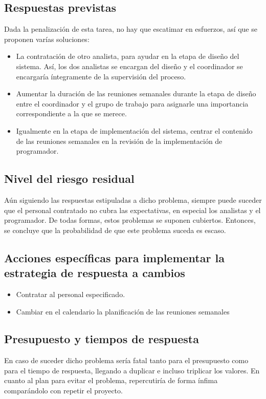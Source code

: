 \documentclass[11pt,a4paper,spanish,twoside]{book}
\begin{document}
\subsection{Respuestas previstas}
Dada la penalización de esta tarea, no hay que escatimar en esfuerzos, así
que se proponen varías soluciones:
\begin{itemize}
\item La contratación de otro analista, para ayudar en la etapa de diseño del
  sistema. Así, los dos analistas se encargan del diseño y el coordinador se
  encargaría íntegramente de la supervisión del proceso.
\item Aumentar la duración de las reuniones semanales durante la etapa de
  diseño entre el coordinador y el grupo de trabajo para asignarle una
  importancia correspondiente a la que se merece.
\item Igualmente en la etapa de implementación del sistema, centrar el
  contenido de las reuniones semanales en la revisión de la implementación de
  programador.
\end{itemize}

\subsection{Nivel del riesgo residual}
Aún siguiendo las respuestas estipuladas a dicho problema, siempre puede
suceder que el personal contratado no cubra las expectativas, en especial los
analistas y el programador. De todas formas, estos problemas se suponen
cubiertos. Entonces, se concluye que la probabilidad de que este problema
suceda es escaso.

\subsection{Acciones específicas para implementar la estrategia de respuesta
  a cambios}
\begin{itemize}
\item Contratar al personal especificado.
\item Cambiar en el calendario la planificación de las reuniones semanales
\end{itemize}

\subsection{Presupuesto y tiempos de respuesta}
En caso de suceder dicho problema sería fatal tanto para el presupuesto como
para el tiempo de respuesta, llegando a duplicar e incluso triplicar los
valores. En cuanto al plan para evitar el problema, repercutiría de forma
ínfima comparándolo con repetir el proyecto. 
\end{document}
